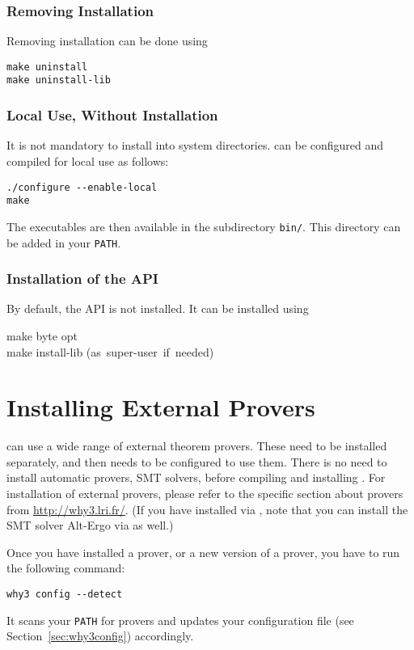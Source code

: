 \subsubsection{Removing Installation}

Removing installation can be done using
\begin{verbatim}
make uninstall
make uninstall-lib
\end{verbatim}

\subsubsection{Local Use, Without  Installation}

It is not mandatory to install \why into system directories.
\why can be configured and compiled for local use as follows:
\begin{verbatim}
./configure --enable-local
make
\end{verbatim}
The \why executables are then available in the subdirectory
\texttt{bin/}. This directory can be added in your \texttt{PATH}.

\subsubsection{Installation of the \why API}
\label{sec:installlib}

By default, the \why API is not installed. It can be installed using
\begin{flushleft}\ttfamily
make byte opt \\
make install-lib \mbox{\rmfamily (as super-user if needed)}
\end{flushleft}

\section{Installing External Provers}
\label{provers}

\why can use a wide range of external theorem provers. These need to
be installed separately, and then \why needs to be configured to use
them. There is no need to install automatic provers, \eg SMT solvers,
before compiling and installing \why.
For installation of external provers, please refer to the specific
section about provers from \url{http://why3.lri.fr/}.
(If you have installed \why via \opam, note that you can install the
SMT solver Alt-Ergo via \opam as well.)

Once you have installed a prover, or a new version of a prover, you
have to run the following command:
\begin{verbatim}
why3 config --detect
\end{verbatim}
It scans your \texttt{PATH} for provers and updates your configuration
file (see Section~\ref{sec:why3config}) accordingly.

